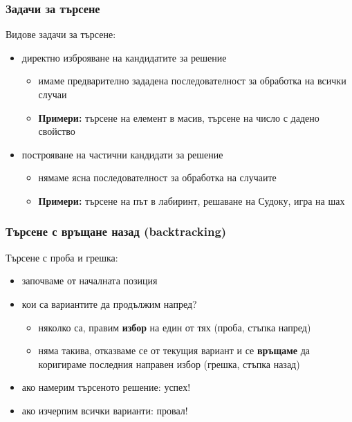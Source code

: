 \documentclass[alsotrans]{beamerswitch}
\begin{document}
\begin{frame}
  \frametitle{Задачи за търсене}

  Видове задачи за търсене:
  \begin{itemize}[<+->]
  \item директно изброяване на кандидатите за решение
    \begin{itemize}
    \item имаме предварително зададена последователност за обработка на всички случаи
    \item \textbf{Примери:} търсене на елемент в масив, търсене на число с дадено свойство
    \end{itemize}
  \item построяване на частични кандидати за решение
    \begin{itemize}
    \item нямаме ясна последователност за обработка на случаите
    \item \textbf{Примери: } търсене на път в лабиринт, решаване на Судоку, игра на шах
    \end{itemize}
  \end{itemize}
\end{frame}

\begin{frame}
  \frametitle{Търсене с връщане назад (backtracking)}

  Търсене с \alert{проба и грешка}:
  \begin{itemize}[<+->]
  \item започваме от началната позиция
  \item кои са вариантите да продължим напред?
    \begin{itemize}
    \item няколко са, правим \textbf{избор} на един от тях \alert{(проба, стъпка напред)}
    \item няма такива, отказваме се от текущия вариант и се \textbf{връщаме} да коригираме последния направен избор \alert{(грешка, стъпка назад)}
    \end{itemize}
  \item ако намерим търсеното решение: \alert{успех!}
  \item ако изчерпим всички варианти: \alert{провал!}
  \end{itemize}
\end{frame}
\end{document}
